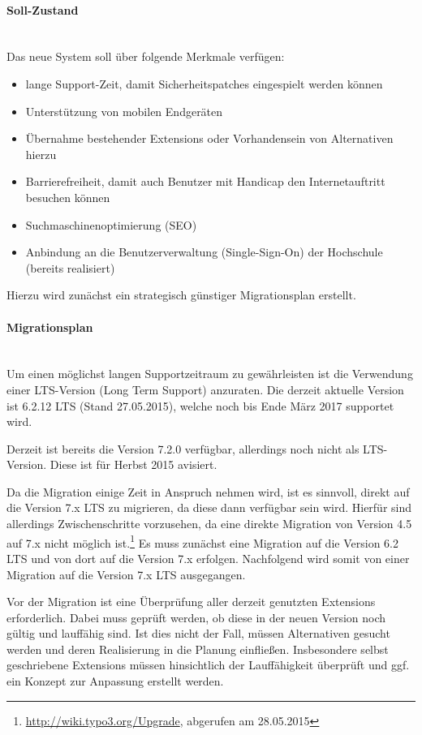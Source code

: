 \paragraph{Soll-Zustand}\mbox{}\\
Das neue System soll über folgende Merkmale verfügen:
\begin{itemize}
\item lange Support-Zeit, damit Sicherheitspatches eingespielt werden können
\item Unterstützung von mobilen Endgeräten
\item Übernahme bestehender Extensions oder Vorhandensein von Alternativen hierzu
\item Barrierefreiheit, damit auch Benutzer mit Handicap den Internetauftritt besuchen können
\item Suchmaschinenoptimierung (SEO)
\item Anbindung an die Benutzerverwaltung (Single-Sign-On) der Hochschule (bereits realisiert)
\end{itemize}
Hierzu wird zunächst ein strategisch günstiger Migrationsplan erstellt.

\paragraph{Migrationsplan}\mbox{}\\
Um einen möglichst langen Supportzeitraum zu gewährleisten ist die Verwendung einer LTS-Version (Long Term Support) anzuraten. Die derzeit aktuelle Version ist 6.2.12 LTS (Stand 27.05.2015), welche noch bis Ende März 2017 supportet wird.

Derzeit ist bereits die Version 7.2.0 verfügbar, allerdings noch nicht als LTS-Version. Diese ist für Herbst 2015 avisiert. 

Da die Migration einige Zeit in Anspruch nehmen wird, ist es sinnvoll, direkt auf die Version 7.x LTS zu migrieren, da diese dann verfügbar sein wird. Hierfür sind allerdings Zwischenschritte vorzusehen, da eine direkte Migration von Version 4.5 auf 7.x nicht möglich ist.\footnote{\url{http://wiki.typo3.org/Upgrade}, abgerufen am 28.05.2015} Es muss zunächst eine Migration auf die Version 6.2 LTS und von dort auf die Version 7.x erfolgen. Nachfolgend wird somit von einer Migration auf die Version 7.x LTS ausgegangen.

Vor der Migration ist eine Überprüfung aller derzeit genutzten Extensions erforderlich. Dabei muss geprüft werden, ob diese in der neuen Version noch gültig und lauffähig sind. Ist dies nicht der Fall, müssen Alternativen gesucht werden und deren Realisierung in die Planung einfließen. Insbesondere selbst geschriebene Extensions müssen hinsichtlich der Lauffähigkeit überprüft und ggf. ein Konzept zur Anpassung erstellt werden.

